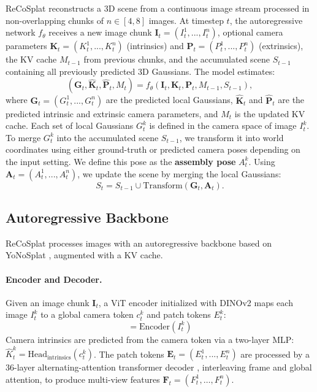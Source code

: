 \documentclass[runningheads]{llncs}
\begin{document}
ReCoSplat reconstructs a 3D scene from a continuous image stream processed in non-overlapping chunks of $n \in [4, 8]$ images.
At timestep $t$, the autoregressive network $f_\theta$ receives a new image chunk $\mathbf{I}_t =(I_t^1, ..., I_t^n)$, optional camera parameters $\mathbf{K}_t = (K_t^1, ..., K_t^n)$ (intrinsics) and $\mathbf{P}_t = (P_t^1, ..., P_t^n)$ (extrinsics), the KV cache $M_{t-1}$ from previous chunks, and the accumulated scene $S_{t-1}$ containing all previously predicted 3D Gaussians.
The model estimates:
\begin{equation}
    (\mathbf{G}_t, \hat{\mathbf{K}}_t, \hat{\mathbf{P}}_t, M_t) 
    = 
    f_\theta(
        \mathbf{I}_t, \mathbf{K}_t, \mathbf{P}_t, M_{t - 1}, S_{t - 1}
    ),
\end{equation}
where $\mathbf{G}_t = (G_t^1, ..., G_t^n)$ are the predicted local Gaussians, $\hat{\mathbf{K}}_t$ and $\hat{\mathbf{P}}_t$ are the predicted intrinsic and extrinsic camera parameters, and $M_t$ is the updated KV cache.
Each set of local Gaussians $G_t^k$ is defined in the camera space of image $I_t^k$.
To merge $G_t^k$ into the accumulated scene $S_{t-1}$, we transform it into world coordinates using either ground-truth or predicted camera poses depending on the input setting.
We define this pose as the \textbf{assembly pose} $A_t^k$.
Using $\mathbf{A}_t = (A_t^1, ..., A_t^n)$, we update the scene by merging the local Gaussians:
\begin{equation}
    S_t = S_{t-1} \cup \text{Transform}(\mathbf{G}_t, \mathbf{A}_t).
\end{equation}

\subsection{Autoregressive Backbone}
\label{sec:autoregressive-backbone}

ReCoSplat processes images with an autoregressive backbone based on YoNoSplat \cite{ye2025yonosplatneedmodelfeedforward}, augmented with a KV cache.

\vspace{-2mm} \paragraph{\textbf{Encoder and Decoder}.}

Given an image chunk $\mathbf{I}_t$, a ViT encoder \cite{dosovitskiy2021an} initialized with DINOv2 \cite{oquab2024dinov} maps each image $I_t^k$ to a global camera token $c_t^k$ and patch tokens $E_t^k$:
\begin{equation}
    [c_t^k, E_t^k] = \text{Encoder}(I_t^k)
\end{equation}
Camera intrinsics are predicted from the camera token via a two-layer MLP: $\hat{K}_t^k = \text{Head}_\text{intrinsics}(c_t^k)$.
The patch tokens $\mathbf{E}_t = (E_t^1, ..., E_t^n)$ are processed by a 36-layer alternating-attention transformer decoder \cite{pi3}, interleaving frame and global attention, to produce multi-view features $\mathbf{F}_t = (F_t^1, \ldots, F_t^n)$.
\end{document}
